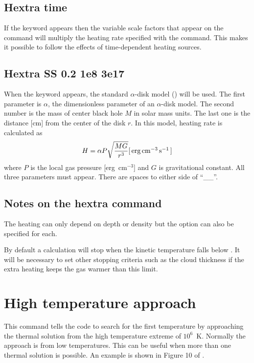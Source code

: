 \subsection{Hextra time}

If the  keyword appears then the variable
scale factors that appear
on the  command will multiply the heating
rate specified with the  command.
This makes it possible to follow
the effects of time-dependent heating sources.

\subsection{Hextra SS 0.2 1e8 3e17}

When the keyword  appears, the standard $\alpha$-disk model
(\citet{Shakura1973}) will be used. The first parameter is $\alpha$, 
the dimensionless parameter of an $\alpha$-disk model. 
The second number is the mass of center black hole $M$ in solar mass units. 
The last one is the distance [cm] from the center of the disk $r$. 
In this model, heating rate is calculated as
\begin{equation}
H=\alpha P\sqrt{\frac{MG}{r^3}}[\mbox{${\rm\thinspace erg}{\rm\thinspace cm}^{-3}{\rm\thinspace s}^{-1}\,$}]
\end{equation}
where $P$ is the local gas pressure [erg~cm$^{-3}$] 
and $G$ is gravitational constant. 
All three parameters must appear.
There are spaces to either side of
``\_\_''. 

\subsection{Notes on the hextra command}

The heating can only depend on depth or density
but the  option can
also be specified for each.

By default a calculation will stop when the kinetic temperature falls
below \TEMPSTOPDEFAULT.  It will be necessary to set other stopping criteria such
as the cloud thickness if the extra heating keeps the gas warmer than this
limit.

\section{High temperature approach}

This command tells the code to search for the first temperature by
approaching the thermal solution from the high temperature extreme of $10^6$~K.
Normally the approach is from low temperatures.
This can be useful
when more than one thermal solution is possible.
An example is shown in Figure 10 of \citet{FerlandFabian2009}.


